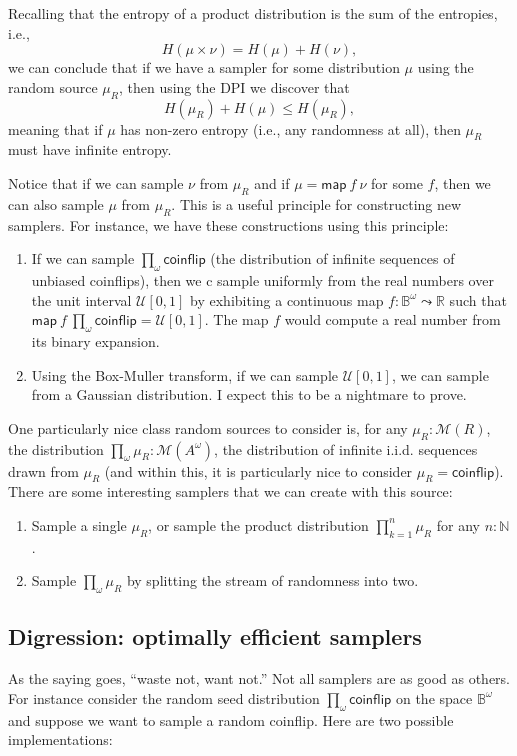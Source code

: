 \documentclass{article}           %
\newcommand{\R}{\mathbb{R}}
\newcommand{\map}[2]{\mathsf{map}\ {#1}\ {#2}}
\newcommand{\nat}{\mathbb{N}}
\newcommand{\Dist}[1]{\mathcal{M}({#1})}
\newcommand{\coinflip}{\mathsf{coinflip}}
\newcommand{\bool}{\mathbb{B}}
\begin{document}
Recalling that the entropy of a product distribution is the sum of the entropies, i.e.,
\[
H(\mu \times \nu) = H(\mu) + H(\nu),
\]
we can conclude that if we have a sampler for some distribution $\mu$ using the random source $\mu_R$, then using the DPI we discover that
\[
H(\mu_R) + H(\mu) \le H(\mu_R),
\]
meaning that if $\mu$ has non-zero entropy (i.e., any randomness at all), then $\mu_R$ must have infinite entropy.

Notice that if we can sample $\nu$ from $\mu_R$ and if $\mu = \map{f}{\nu}$ for some $f$, then we can also sample $\mu$ from $\mu_R$. This is a useful principle for constructing new samplers. For instance, we have these constructions using this principle:
\begin{enumerate}
\item If we can sample $\prod_\omega \coinflip$ (the distribution of infinite sequences of unbiased coinflips), then we c sample uniformly from the real numbers over the unit interval $\mathcal{U}[0,1]$ by exhibiting a continuous map $f : \bool^\omega \leadsto \R$ such that $\map{f}{\prod_\omega \coinflip} = \mathcal{U}[0,1]$. The map $f$ would compute a real number from its binary expansion.
\item Using the Box-Muller transform, if we can sample $\mathcal{U}[0,1]$, we can sample from a Gaussian distribution. I expect this to be a nightmare to prove.
\end{enumerate}

One particularly nice class random sources to consider is, for any $\mu_R : \Dist{R}$, the distribution $\prod_\omega \mu_R : \Dist{A^\omega}$, the distribution of infinite i.i.d. sequences drawn from $\mu_R$ (and within this, it is particularly nice to consider $\mu_R = \coinflip$). There are some interesting samplers that we can create with this source:
\begin{enumerate}
\item Sample a single $\mu_R$, or sample the product distribution $\prod_{k=1}^n \mu_R$ for any $n : \nat$.
\item Sample $\prod_\omega \mu_R$ by splitting the stream of randomness into two.
\end{enumerate}

\subsection{Digression: optimally efficient samplers}

As the saying goes, ``waste not, want not.'' Not all samplers are as good as others. For instance consider the random seed distribution $\prod_\omega \coinflip$ on the space $\bool^\omega$ and suppose we want to sample a random coinflip. Here are two possible implementations:
\end{document}
